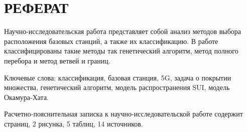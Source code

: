 
\chapter*{ \hfill РЕФЕРАТ \hfill}
\setcounter{page}{3}

Научно-исследовательская работа представляет собой анализ методов выбора расположения базовых станций, а также их классификацию. В работе классифицированы такие методы так генетический алгоритм, метод полного перебора и метод ветвей и границ.

Ключевые слова: классификация, базовая станция, 5G, задача о покрытии множества, генетический алгоритм, модель распространения SUI, модель Окамура-Хата.

Расчетно-пояснительная записка к научно-исследовательской работе содержит \pageref{LastPage} страниц, 2 рисунка, 5 таблиц, 14 источников.